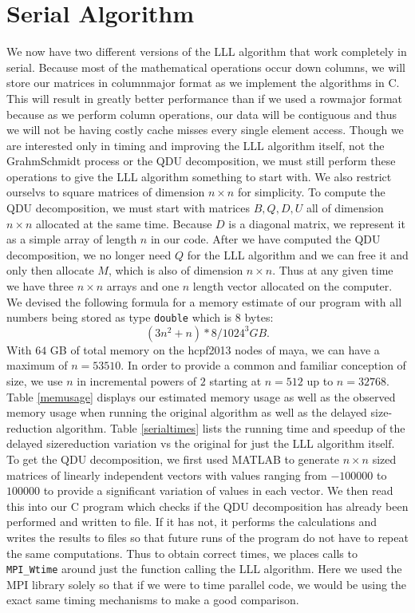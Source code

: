\documentclass[12pt]{article}
\numberwithin{equation}{section}
\numberwithin{table}{section}
\numberwithin{figure}{section}
\begin{document}
\section{Serial Algorithm}
We now have two different versions of the LLL algorithm that work completely in serial. Because most of the mathematical operations occur down columns, we will store our matrices in column\-major format as we implement the algorithms in C. This will result in greatly better performance than if we used a row\-major format because as we perform column operations, our data will be contiguous and thus we will not be having costly cache misses every single element access. Though we are interested only in timing and improving the LLL algorithm itself, not the Grahm\-Schmidt process or the QDU decomposition, we must still perform these operations to give the LLL algorithm something to start with. We also restrict ourselvs to square matrices of dimension $n \times n$ for simplicity. To compute the QDU decomposition, we must start with matrices $B,Q,D,U$ all of dimension $n \times n$ allocated at the same time. Because $D$ is a diagonal matrix, we represent it as a simple array of length $n$ in our code. After we have computed the QDU decomposition, we no longer need $Q$ for the LLL algorithm and we can free it and only then allocate $M$, which is also of dimension $n \times n$. Thus at any given time we have three $n \times n$ arrays and one $n$ length vector allocated on the computer. We devised the following formula for a memory estimate of our program with all numbers being stored as type \texttt{double} which is $8$ bytes:
$$(3n^2 + n) * 8 / 1024^3 GB.$$
With $64$ GB of total memory on the hcpf2013 nodes of maya, we can have a maximum of $n=53510$. In order to provide a common and familiar conception of size, we use $n$ in incremental powers of $2$ starting at $n=512$ up to $n=32768$. Table \ref{memusage} displays our estimated memory usage as well as the observed memory usage when running the original algorithm as well as the delayed size-reduction algorithm. Table \ref{serialtimes} lists the running time and speedup of the delayed size\-reduction variation vs the original for just the LLL algorithm itself. To get the QDU decomposition, we first used MATLAB to generate $n \times n$ sized matrices of linearly independent vectors with values ranging from $-100000$ to $100000$ to provide a significant variation of values in each vector. We then read this into our C program which checks if the QDU decomposition has already been performed and written to file. If it has not, it performs the calculations and writes the results to files so that future runs of the program do not have to repeat the same computations. Thus to obtain correct times, we places calls to \texttt{MPI\_Wtime} around just the function calling the LLL algorithm. Here we used the MPI library solely so that if we were to time parallel code, we would be using the exact same timing mechanisms to make a good comparison.
\end{document}
